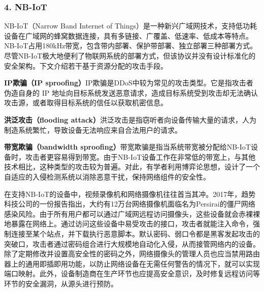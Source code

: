 \subsubsection{\textcolor{myblue}{\textbf{4. NB-IoT}}}
\par NB-IoT（Narrow Band Internet of Things）是一种新兴广域网技术，支持低功耗设备在广域网的蜂窝数据连接，具有多链接、广覆盖、低速率、低成本等特点。NB-IoT占用180kHz带宽，包含带内部署、保护带部署、独立部署三种部署方式。尽管NB-IoT极大地便利了物联网系统的部署方式，但该协议并没有设计标准化的安全架构。下文介绍若干基于资源分配的攻击手段。
\par \textcolor{myblue}{\textbf{IP欺骗（IP sproofing）}}\quad IP欺骗是DDoS中较为常见的攻击类型\cite{rajashree2018security}。它是指攻击者伪造自身的 IP 地址向目标系统发送恶意请求，造成目标系统受到攻击却无法确认攻击源，或者取得目标系统的信任以获取机密信息。
\par \textcolor{myblue}{\textbf{洪泛攻击（flooding attack）}}\quad 洪泛攻击是指窃听者向设备传输大量的请求，人为制造系统繁忙，导致设备无法响应来自合法用户的请求。
\par \textcolor{myblue}{\textbf{带宽欺骗（bandwidth sproofing）}}\quad 带宽欺骗是指当系统带宽被分配给NB-IoT设备时，攻击者更容易得到带宽。由于NB-IoT设备工作在非常低的带宽上，与其他技术相比，这种类型的攻击较为普遍。对此，有学者利用博弈论思想，设计了一个自适应的入侵检测系统以消除恶意干扰，保持网络组件的安全性\cite{supply2018bandwidth}。
\par 在支持NB-IoT的设备中，视频录像机和网络摄像机往往首当其冲。2017年，趋势科技公司的一份报告指出，大约有12万台网络摄像机面临名为Persirai的僵尸网络感染风险。由于所有用户都可以通过广域网远程访问摄像头，这些设备就会赤裸裸地暴露在网络上。通过访问这些设备中易受攻击的接口，攻击者就能注入命令，强制连接至某个站点，并下载执行恶意脚本。默认密码、弱口令都是黑客发起攻击的突破口，攻击者通过密码组合进行大规模地自动化入侵，从而接管网络内的设备。除了定期修改并设置高安全性的密码之外，网络摄像头的管理人员也应当禁用路由器上的通用即插即用功能，以防止网络设备在无需任何警告的情况下，就可以实现端口映射。此外，设备制造商在生产环节也应提高安全意识，及时修复远程访问等环节的安全漏洞，从源头进行预防。

